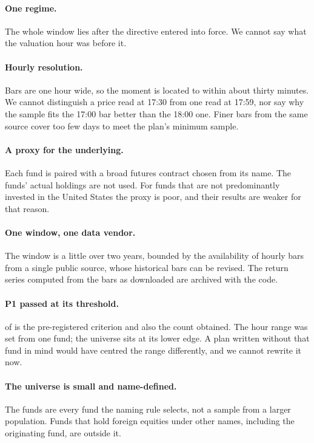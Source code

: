 \documentclass[11pt,a4paper]{article}
\begin{document}
\paragraph{One regime.} The whole window lies after the directive entered
into force. We cannot say what the valuation hour was before it.

\paragraph{Hourly resolution.} Bars are one hour wide, so the moment is
located to within about thirty minutes. We cannot distinguish a price read at
17:30 from one read at 17:59, nor say why the sample fits the 17:00 bar better
than the 18:00 one. Finer bars from the same source cover too few days to
meet the plan's minimum sample.

\paragraph{A proxy for the underlying.} Each fund is paired with a broad
futures contract chosen from its name. The funds' actual holdings are not
used. For funds that are not predominantly invested in the United States the
proxy is poor, and their results are weaker for that reason.

\paragraph{One window, one data vendor.} The window is a little over two
years, bounded by the availability of hourly bars from a single public
source, whose historical bars can be revised. The return series computed from
the bars as downloaded are archived with the code.

\paragraph{P1 passed at its threshold.} \PoneNeed{} of \NFunds{} is the
pre-registered criterion and also the count obtained. The hour range was set from one fund;
the universe sits at its lower edge. A plan written without that fund in mind
would have centred the range differently, and we cannot rewrite it now.

\paragraph{The universe is small and name-defined.} The \NFunds{} funds are
every fund the naming rule selects, not a sample from a larger population. Funds that
hold foreign equities under other names, including the originating fund, are
outside it.
\end{document}
